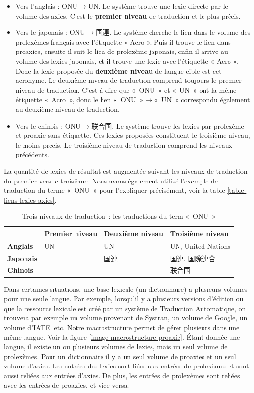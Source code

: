 \documentclass[10pt,a4paper,twoside]{article}
\newcommand{\Chinois}[1]{{\fontspec[Scale=0.9]{STSong}#1}}
\newcommand{\Japonais}[1]{{\fontspec[Scale=0.9]{Hiragino Kaku Gothic Pro}#1}}
\begin{document}
\begin{itemize}
\item Vers l’anglais : ONU\ensuremath{\to}UN. Le système trouve une lexie directe par le volume des axies. C’est le \textbf{premier niveau} de traduction et le plus précis.
\item Vers le japonais : ONU\ensuremath{\to}\Japonais{国連}. Le système cherche le lien dans le volume des prolexèmes français avec l’étiquette « Acro ». Puis il trouve le lien dans proaxies, ensuite il suit le lien de prolexème japonais, enfin il arrive au volume des lexies japonais, et il trouve une lexie avec l’étiquette « Acro ». Donc la lexie proposée du \textbf{deuxième niveau} de langue cible est cet acronyme. Le deuxième niveau de traduction comprend toujours le premier niveau de traduction. C'est-à-dire que « ONU » et « UN » ont la même étiquette « Acro », donc le lien « ONU »\ensuremath{\to}« UN » correspondu également au deuxième niveau de traduction.
\item Vers le chinois : ONU\ensuremath{\to}\Chinois{联合国}. Le système trouve les lexies par prolexème et proaxie sans étiquette. Ces lexies proposées constituent le troisième niveau, le moins précis. Le troisième niveau de traduction comprend les niveaux précédents.
\end{itemize}
La quantité de lexies de résultat est augmentée suivant les niveaux de traduction du premier vers le troisième. Nous avons également utilisé l'exemple de traduction du terme « ONU » pour l'expliquer précisément, voir la table \ref{table-liens-lexies-axies}.

\begin{table}[!h]
\centering
	\begin{tabular}{|l|l|l|l|}
	\hline
	\textbf{} & \textbf{Premier niveau} & \textbf{Deuxième niveau} & \textbf{Troisième niveau} \\
	\hline
	\textbf{Anglais} & UN & UN & UN, United Nations \\
	\hline
	\textbf{Japonais} &  & \Japonais{国連} &\Japonais{国連}, \Japonais{国際連合} \\
	\hline
	\textbf{Chinois} & & &\Chinois{联合国}  \\
	\hline
	\end{tabular}
\caption{ Trois niveaux de traduction : les traductions du term « ONU » }\label{table-3-niveaux-traduction}
\end{table}

Dans certaines situations, une base lexicale (un dictionnaire) a plusieurs volumes pour une seule langue. Par exemple, lorsqu'il y a plusieurs versions d’édition ou que la ressource lexicale est créé par un système de Traduction Automatique, on trouvera par exemple un volume provenant de Systran, un volume de Google, un volume d'IATE, etc. Notre macrostructure permet de gérer plusieurs dans une même langue. Voir la figure \ref{image-macrostructure-proaxie}. Étant donnée une langue, il existe un ou plusieurs volumes de lexies, mais un seul volume de prolexèmes. Pour un dictionnaire il y a un seul volume de proaxies et un seul volume d'axies. Les entrées des lexies sont liées aux entrées de prolexèmes et sont aussi reliées aux entrées d'axies. De plus, les entrées de prolexèmes sont reliées avec les entrées de proaxies, et vice-versa.
\end{document}
